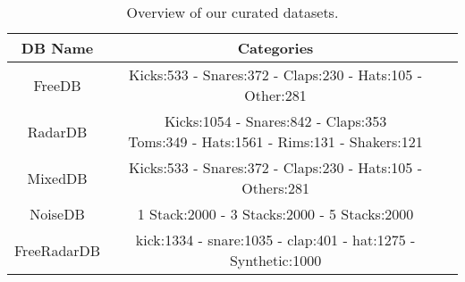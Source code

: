 \documentclass[\main/thesis.tex]{subfiles}
\begin{document}
\begin{table}[]
\begin{tabular}{ |c|c|c| } 
\hline
DB Name & Categories \\ \hline
FreeDB  & Kicks:533 - Snares:372 - Claps:230 - Hats:105 - Other:281            \\ \hline
RadarDB & \makecell{Kicks:1054 - Snares:842 - Claps:353 \\ Toms:349 - Hats:1561 - Rims:131 - Shakers:121} \\ \hline
MixedDB & Kicks:533 - Snares:372 - Claps:230 - Hats:105 - Others:281                     \\ \hline
NoiseDB & 1 Stack:2000 - 3 Stacks:2000 - 5 Stacks:2000                         \\ \hline
 FreeRadarDB & kick:1334 - snare:1035 - clap:401 - hat:1275 - Synthetic:1000 \\ \hline
\end{tabular}
    \caption{Overview of our curated datasets.}
    \label{table:all_db}
\end{table}








\end{document}
